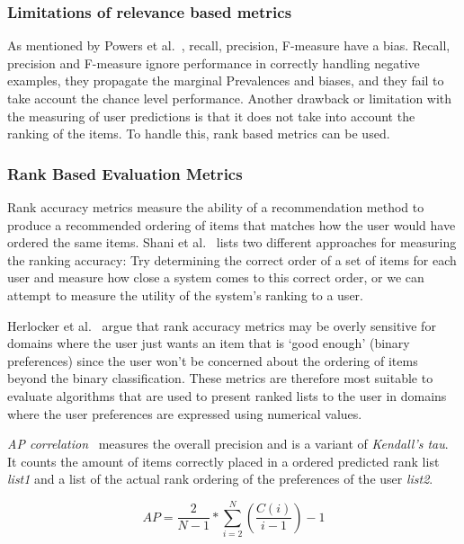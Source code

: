 \subsubsection{Limitations of relevance based metrics}
\label{subsec:limitations-relevancebased}

As mentioned by Powers et al.~\cite{powers2007}, recall, precision, F-measure
have a bias.  Recall, precision and F-measure ignore performance in correctly
handling negative examples, they propagate the marginal Prevalences and biases,
and they fail to take account the chance level performance.  Another drawback
or limitation with the measuring of user predictions is that it does not take
into account the ranking of the items. To handle this, rank based metrics can
be used.

\subsubsection{Rank Based Evaluation Metrics}
\label{subsec:rankbased}

Rank accuracy metrics measure the ability of a recommendation method to produce
a recommended ordering of items that matches how the user would have ordered
the same items. Shani et al.~\cite{Shani2011} lists two different approaches
for measuring the ranking accuracy: Try determining the correct order of a set
of items for each user and measure how close a system comes to this correct
order, or we can attempt to measure the utility of the system's ranking to a
user.

Herlocker et al.~\cite{Herlocker2004} argue that rank accuracy metrics may be
overly sensitive for domains where the user just wants an item that is `good
enough' (binary preferences) since the user won't be concerned about the
ordering of items beyond the binary classification. These metrics are therefore
most suitable to evaluate algorithms that are used to present ranked lists to
the user in domains where the user preferences are expressed using numerical
values.


\textit{AP correlation}~\cite{Yilmaz:2008:NRC:1390334.1390435} measures the
overall precision and is a variant of \textit{Kendall's tau}.  It counts the
amount of items correctly placed in a ordered predicted rank list
\textit{list1} and a list of the actual rank ordering of the preferences of the
user \textit{list2}.

\begin{equation}
	AP = \frac{2}{N - 1} * \sum_{i=2}^{N}{(\frac{C(i)}{i - 1})} - 1
	\label{equation:ap}
\end{equation}

